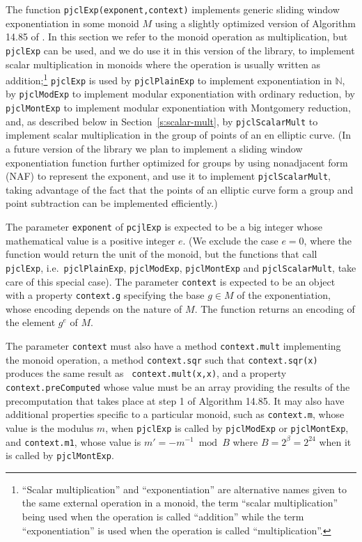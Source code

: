 \documentclass[12pt]{article}
\begin{document}
The function {\tt pjclExp(exponent,context)} implements generic
sliding window exponentiation in some monoid $M$ using a slightly
optimized version of Algorithm 14.85 of \cite{Menezes97handbookof}.
In this section we refer to the monoid operation as multiplication,
but {\tt pjclExp} can be used, and we do use it in this version of the
library, to implement scalar multiplication in monoids where the
operation is usually written as addition;\footnote{``Scalar multiplication'' and ``exponentiation'' are alternative names given
to the same external operation in a monoid, the term ``scalar multiplication''
being used when the operation is called ``addition'' while the term
``exponentiation'' is used when the operation is called
``multiplication''.}
 {\tt pjclExp} is used by
{\tt pjclPlainExp} to implement exponentiation in $\mathbb{N}$, by
{\tt pjclModExp} to implement modular exponentiation with ordinary
reduction, by {\tt pjclMontExp} to implement modular exponentiation
with Montgomery reduction, and, as described below in
Section~\ref{s:scalar-mult}, by {\tt pjclScalarMult} to implement
scalar multiplication in the group of points of an en elliptic curve.
(In a future version of the library we plan to implement a sliding
window exponentiation function further optimized for groups by using nonadjacent form (NAF) to represent the exponent, and use
it to implement {\tt pjclScalarMult}, taking advantage of the fact that
the points of an elliptic curve form a group and point subtraction can
be implemented efficiently.)

The parameter {\tt exponent} of {\tt pcjlExp} is expected to be a big
integer whose mathematical value is a positive integer $e$.  (We
exclude the case $e=0$, where the function would return the unit of
the monoid, but the functions that call {\tt pjclExp}, i.e.\ {\tt pjclPlainExp}, {\tt pjclModExp}, {\tt pjclMontExp} and {\tt pjclScalarMult}, take care of this special case).  The parameter {\tt context}
is expected to be an object with a property {\tt context.g} specifying
the base $g \in M$ of the exponentiation, whose encoding depends on
the nature of $M$.  The function returns an encoding of the element
$g^e$ of $M$.

The parameter {\tt context} must also have a method {\tt context.mult}
implementing the monoid operation, a method {\tt context.sqr} such
that {\tt context.sqr(x)} produces the same result as {\tt
  context.mult(x,x)}, and a property {\tt context.preComputed} whose
value must be an array providing the results of the precomputation that takes place
at step 1 of Algorithm 14.85.  It may also have additional properties
specific to a particular monoid, such as {\tt context.m}, whose value
is the modulus $m$, when {\tt pjclExp} is called by {\tt pjclModExp} or
{\tt pjclMontExp}, and {\tt context.m1}, whose value is $m' = -m^{-1}
\bmod B$ where $B=2^\beta=2^{24}$ when it is called by {\tt pjclMontExp}.
\end{document}
